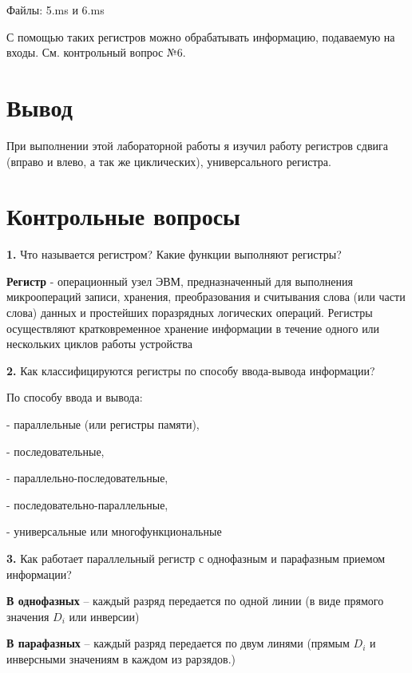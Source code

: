\documentclass[a4paper,12pt]{article}
\begin{document}
\noindent Файлы: 5.ms и 6.ms\newline

\noindent С помощью таких регистров можно обрабатывать информацию, подаваемую на входы. См. контрольный вопрос №6.

\section{Вывод}

\noindent При выполнении этой лабораторной работы я изучил работу регистров сдвига (вправо и влево, а так же циклических), универсального регистра.

\section{Контрольные вопросы}

\noindent\textbf{1.} Что называется регистром? Какие функции выполняют регистры?\newline

\noindent\textbf{Регистр} - операционный узел ЭВМ, предназначенный для выполнения микроопераций записи, хранения, преобразования и считывания слова (или части слова) данных и простейших поразрядных логических операций. Регистры осуществляют кратковременное хранение информации в течение одного или нескольких циклов работы устройства\newline

\noindent\textbf{2.} Как классифицируются регистры по способу ввода-вывода информации? \newline

\noindent По способу ввода и вывода:

- параллельные (или регистры памяти), 

- последовательные, 

- параллельно-последовательные, 

- последовательно-параллельные, 

- универсальные или многофункциональные\newline

\noindent\textbf{3.} Как работает параллельный регистр с однофазным и парафазным приемом информации?\newline

\noindent \textbf{В однофазных} -- каждый разряд передается по одной линии (в виде прямого значения $D_{i}$ или инверсии)\newline

\noindent \textbf{В парафазных} -- каждый разряд передается по двум линями (прямым $D_{i}$ и инверсными значениям в каждом из рарзядов.)\newline
\end{document}
